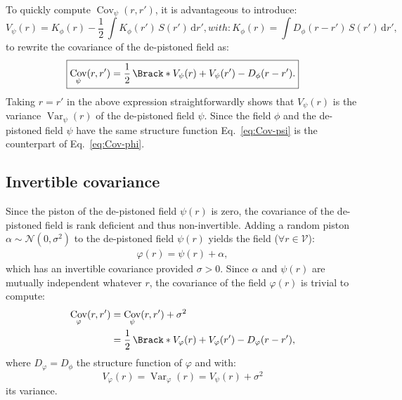 \documentclass{article}
\DeclareMathOperator{\Var}{Var}
\DeclareMathOperator{\Cov}{Cov}
\begin{document}
To quickly compute $\Cov_{\psi}(r,r')$, it is advantageous to introduce:
\begin{subequations}
  \begin{equation}
    \label{eq:C-phi}
    V_{\psi}(r) = K_{\phi}(r)
    - \frac{1}{2}\,\int K_{\phi}(r')\,S(r')\,\mathrm{d}r',
  \end{equation}
  with:
  \begin{equation}
    \label{eq:K-phi}
    K_{\phi}(r) = \int D_{\phi}(r - r')\,S(r')\,\mathrm{d}r',
  \end{equation}
\end{subequations}
to rewrite the covariance of the de-pistoned field as:
\begin{equation}
  \boxed{
    \Cov_{\psi}(r,r')
    = \frac{1}{2}\,\Brack*{V_{\psi}(r) + V_{\psi}(r') - D_{\phi}(r - r')}.
  }
  \label{eq:Cov-psi}
\end{equation}
Taking $r = r'$ in the above expression straightforwardly shows that
$V_{\psi}(r)$ is the variance $\Var_{\psi}(r)$ of the de-pistoned field $\psi$.
Since the field $\phi$ and the de-pistoned field $\psi$ have the same structure
function Eq.~\eqref{eq:Cov-psi} is the counterpart of Eq.~\eqref{eq:Cov-phi}.


\subsection{Invertible covariance}

Since the piston of the de-pistoned field $\psi(r)$ is zero, the covariance of
the de-pistoned field is rank deficient and thus non-invertible. Adding a
random piston $\alpha \sim \mathcal{N}(0,\sigma^{2})$ to the de-pistoned field
$\psi(r)$ yields the field ($\forall r \in \mathcal{V}$):
\begin{align}
  \label{eq:varphi-def}
  \varphi(r) = \psi(r) + \alpha,
\end{align}
which has an invertible covariance provided $\sigma > 0$. Since $\alpha$ and $\psi(r)$ are
mutually independent whatever $r$, the covariance of the field $\varphi(r)$ is trivial to
compute:
\begin{align}
  \Cov_{\varphi}(r,r')
  &= \Cov_{\psi}(r,r') + \sigma^{2} \notag\\
  &= \frac{1}{2}\,\Brack*{V_{\varphi}(r) + V_{\varphi}(r') - D_{\varphi}(r - r')},
  \label{eq:Cov-varphi}
\end{align}
where $D_{\varphi} = D_{\phi}$ the structure function of $\varphi$ and with:
\begin{equation}
  \label{eq:Var-varphi}
  V_{\varphi}(r) = \Var_{\varphi}(r) = V_{\psi}(r) + \sigma^{2}
\end{equation}
its variance.
\end{document}
